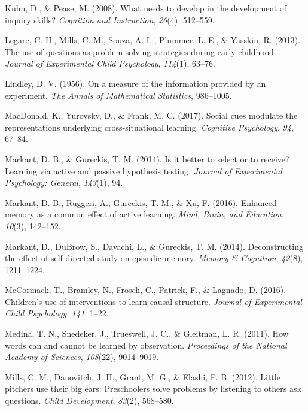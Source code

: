 \documentclass[english,man]{apa6}
\theoremstyle{definition}
\theoremstyle{definition}
\theoremstyle{definition}
\theoremstyle{remark}
\begin{document}
\hypertarget{ref-kuhn2008needs}{}
Kuhn, D., \& Pease, M. (2008). What needs to develop in the development
of inquiry skills? \emph{Cognition and Instruction}, \emph{26}(4),
512--559.

\hypertarget{ref-legare2013use}{}
Legare, C. H., Mills, C. M., Souza, A. L., Plummer, L. E., \& Yasskin,
R. (2013). The use of questions as problem-solving strategies during
early childhood. \emph{Journal of Experimental Child Psychology},
\emph{114}(1), 63--76.

\hypertarget{ref-lindley1956measure}{}
Lindley, D. V. (1956). On a measure of the information provided by an
experiment. \emph{The Annals of Mathematical Statistics}, 986--1005.

\hypertarget{ref-macdonald2017social}{}
MacDonald, K., Yurovsky, D., \& Frank, M. C. (2017). Social cues
modulate the representations underlying cross-situational learning.
\emph{Cognitive Psychology}, \emph{94}, 67--84.

\hypertarget{ref-markant2014better}{}
Markant, D. B., \& Gureckis, T. M. (2014). Is it better to select or to
receive? Learning via active and passive hypothesis testing.
\emph{Journal of Experimental Psychology: General}, \emph{143}(1), 94.

\hypertarget{ref-markant2016enhanced}{}
Markant, D. B., Ruggeri, A., Gureckis, T. M., \& Xu, F. (2016). Enhanced
memory as a common effect of active learning. \emph{Mind, Brain, and
Education}, \emph{10}(3), 142--152.

\hypertarget{ref-markant2014deconstructing}{}
Markant, D., DuBrow, S., Davachi, L., \& Gureckis, T. M. (2014).
Deconstructing the effect of self-directed study on episodic memory.
\emph{Memory \& Cognition}, \emph{42}(8), 1211--1224.

\hypertarget{ref-mccormack2016children}{}
McCormack, T., Bramley, N., Frosch, C., Patrick, F., \& Lagnado, D.
(2016). Children's use of interventions to learn causal structure.
\emph{Journal of Experimental Child Psychology}, \emph{141}, 1--22.

\hypertarget{ref-medina2011words}{}
Medina, T. N., Snedeker, J., Trueswell, J. C., \& Gleitman, L. R.
(2011). How words can and cannot be learned by observation.
\emph{Proceedings of the National Academy of Sciences}, \emph{108}(22),
9014--9019.

\hypertarget{ref-mills2012little}{}
Mills, C. M., Danovitch, J. H., Grant, M. G., \& Elashi, F. B. (2012).
Little pitchers use their big ears: Preschoolers solve problems by
listening to others ask questions. \emph{Child Development},
\emph{83}(2), 568--580.
\end{document}
